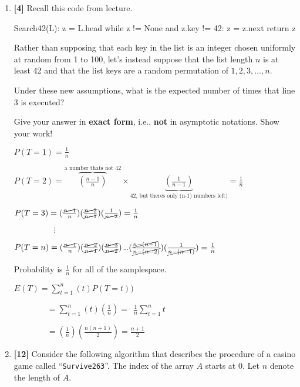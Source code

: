 \documentclass{assignment-263}
\begin{document}
\think
\begin{enumerate}
\item \textbf{[4]}
Recall this code from lecture.

\begin{python}
Search42(L):
  z = L.head
  while z != None and z.key != 42:
     z = z.next
  return z
\end{python}

Rather than supposing that each key in the list is an integer chosen uniformly at random from 1 to 100, let's instead suppose that the list length $n$ is at least 42 and that the list keys are a random permutation of $1, 2, 3, \ldots, n$.

Under these new assumptions, what is the expected number of times that line 3 is executed? 

Give your answer in \textbf{exact form}, i.e., \textbf{not} in asymptotic
		notations. Show your work!








\vskip 5pt
 $P(T=1) = \frac{1}{n}$

 $P(T=2) = \overbrace{(\frac{n-1}{n})}^{\text{a number thats not 42}} \times \underbrace{(\frac{1}{n-1})}_{\text{42, but theres only (n-1) numbers left)}} = \frac{1}{n}$



 $P(T=3) = (\frac{\cancel{n-1}}{n})(\frac{\cancel{n-2}}{\cancel{n-1}})(\frac{1}{\cancel{n-2}})  = \frac{1}{n}$

$\ \ \ \ \ \ \ \ \ \ \ \ \ \ \ \ \ \ \ \ \ \ \vdots$

 $P(T= n) = (\frac{\cancel{n-1}}{n})(\frac{\cancel{n-2}}{\cancel{n-1}})(\frac{\cancel{n-3}}{\cancel{n-2}})$\dots$( \frac{\cancel{n-(n-1})}{\cancel{n-(n-2)}})(\frac{1}{\cancel{n-(n-1)}})= \frac{1}{n}$
\vskip 10pt

Probability is $\frac{1}{n}$ for all of the samplespace.
\vskip 5pt

$E(T) = \sum_{t=1}^{n} (t)P(T=t)) $

\ \ \ \ \ \ \ \ $  = \sum_{t=1}^{n} (t)(\frac{1}{n}) = \ \  \frac{1}{n} \sum_{t=1}^{n}t $

\ \ \ \ \ \ \ \ $  =( \frac{1}{n})(\frac{n(n+1)}{2})= \frac{n+1}{2} $






\item \textbf{[12]}
		Consider the following algorithm that describes the procedure of a
		casino game called ``\texttt{Survive263}''. The index of the array $A$ starts
		at $0$. Let $n$ denote the length of $A$.


\end{enumerate}
\end{document}

